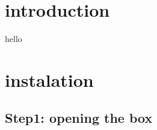 \hypertarget{index_intro_sec}{}\section{introduction}\label{index_intro_sec}
hello \hypertarget{index_install_sec}{}\section{instalation}\label{index_install_sec}
\hypertarget{index_step1}{}\subsection{Step1\-: opening the box}\label{index_step1}

